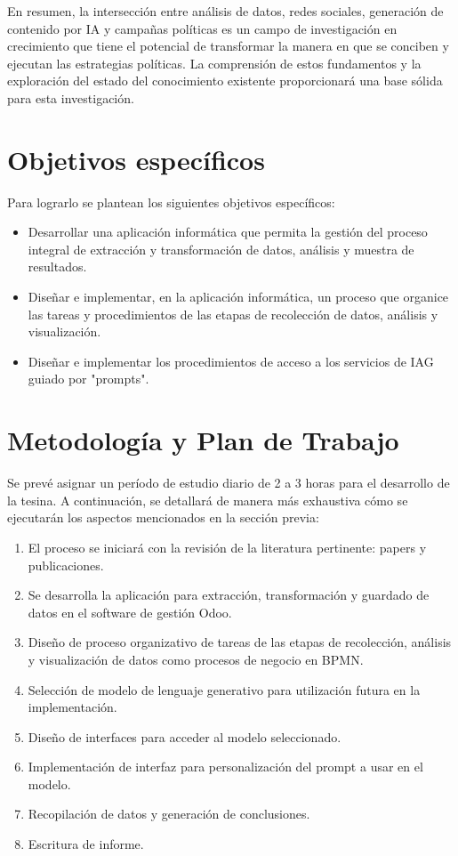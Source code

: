 \documentclass[12pt]{article}
\begin{document}
En resumen, la intersección entre análisis de datos, redes sociales, generación de contenido por IA y campañas políticas es un campo de investigación en crecimiento que tiene el potencial de transformar la manera en que se conciben y ejecutan las estrategias políticas. La comprensión de estos fundamentos y la exploración del estado del conocimiento existente proporcionará una base sólida para esta investigación.

\section{Objetivos específicos}

Para lograrlo se plantean los siguientes objetivos específicos: 

\begin{itemize}
    \item Desarrollar una aplicación informática que permita la gestión del proceso integral de extracción y transformación de datos, análisis y muestra de resultados.
    \item Diseñar e implementar, en la aplicación informática, un proceso que organice las tareas y procedimientos de las etapas de recolección de datos, análisis y visualización. 
    \item Diseñar e implementar los procedimientos de acceso a los servicios de IAG guiado por "prompts".
\end{itemize}

\section{Metodología y Plan de Trabajo}

Se prevé asignar un período de estudio diario de 2 a 3 horas para el desarrollo de la tesina. A continuación, se detallará de manera más exhaustiva cómo se ejecutarán los aspectos mencionados en la sección previa:

\begin{enumerate}
    \item El proceso se iniciará con la revisión de la literatura pertinente: papers y publicaciones.
    \item Se desarrolla la aplicación para extracción, transformación y guardado de datos en el software de gestión Odoo.
    \item Diseño de proceso organizativo de tareas de las etapas de recolección, análisis y visualización de datos como procesos de negocio en BPMN.
    \item Selección de modelo de lenguaje generativo para utilización futura en la implementación.
    \item Diseño de interfaces para acceder al modelo seleccionado.
    \item Implementación de interfaz para personalización del prompt a usar en el modelo.
    \item Recopilación de datos y generación de conclusiones.
    \item Escritura de informe.
\end{enumerate}
\end{document}
